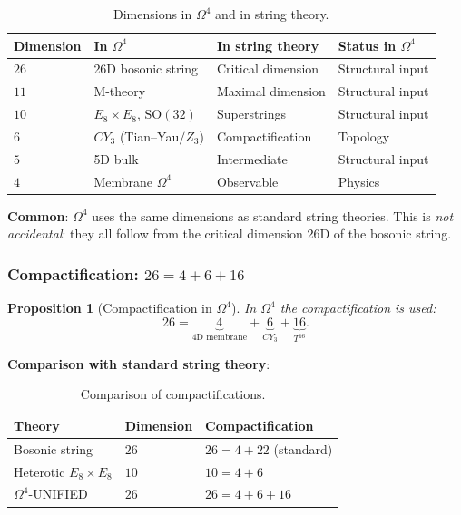 \documentclass[11pt,a4paper]{article}
\newcommand{\SO}{\ensuremath{\mathrm{SO}}}
\newcommand{\CY}{\ensuremath{CY_3}}
\newcommand{\Om}{\ensuremath{\Omega^4}}
\newtheorem{proposition}[theorem]{Proposition}
\theoremstyle{definition}
\begin{document}
\begin{table}[ht]
\centering
\small
\caption{Dimensions in \texorpdfstring{$\Om$}{} and in string theory.}
\label{tab:string-dimensions}
\begin{tabular}{@{}p{1.5cm} p{3cm} p{4.5cm} p{2.5cm}@{}}
\toprule
Dimension & In $\Om$ & In string theory & Status in $\Om$ \\
\midrule
$26$ & 26D bosonic string & Critical dimension & Structural input \\
$11$ & M-theory & Maximal dimension & Structural input \\
$10$ & $E_8 \times E_8$, $\SO(32)$ & Superstrings & Structural input \\
$6$  & $\CY$ (Tian--Yau$/Z_3$) & Compactification & Topology \\
$5$  & 5D bulk & Intermediate & Structural input \\
$4$  & Membrane $\Om$ & Observable & Physics \\
\bottomrule
\end{tabular}
\end{table}

\medskip\noindent
\textbf{Common}: $\Om$ uses the same dimensions as
standard string theories. This is \emph{not accidental}:
they all follow from the critical dimension 26D of the bosonic string.

\subsubsection{Compactification: \texorpdfstring{$26 = 4 + 6 + 16$}{26 = 4 + 6 + 16}}

\begin{proposition}[Compactification in $\Om$]
\label{prop:string-compactification}
In $\Om$ the compactification is used:
\begin{equation}
    \boxed{
    26 = \underbrace{4}_{\text{4D membrane}} + \underbrace{6}_{\CY} + \underbrace{16}_{T^{16}}.
    }
    \label{eq:string-compact-26}
\end{equation}
\end{proposition}

\medskip\noindent
\textbf{Comparison with standard string theory}:
\begin{table}[ht]
\centering
\caption{Comparison of compactifications.}
\label{tab:string-compact-comparison}
\begin{tabular}{lll}
\toprule
Theory & Dimension & Compactification \\
\midrule
Bosonic string & $26$ & $26 = 4 + 22$ (standard) \\
Heterotic $E_8 \times E_8$ & $10$ & $10 = 4 + 6$ \\
$\Om$-UNIFIED & $26$ & $26 = 4 + 6 + 16$ \\
\bottomrule
\end{tabular}
\end{table}
\end{document}
